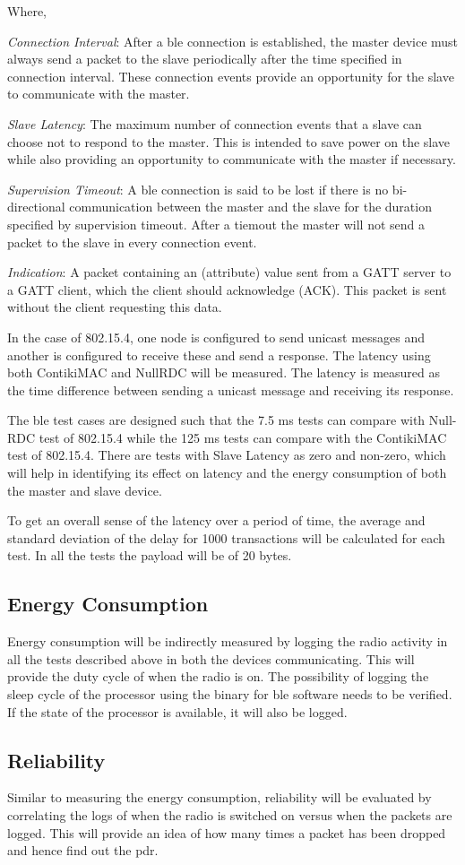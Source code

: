 Where,

\emph{Connection Interval}: After a \gls{ble} connection is established, the master device must always send a packet to the slave periodically after the time specified in connection interval. These connection events provide an opportunity for the slave to communicate with the master.

\emph{Slave Latency}: The maximum number of connection events that a slave can choose not to respond to the master. This is intended to save power on the slave while also providing an opportunity to communicate with the master if necessary.

\emph{Supervision Timeout}: A \gls{ble} connection is said to be lost if there is no bi-directional communication between the master and the slave for the duration specified by supervision timeout. After a tiemout the master will not send a packet to the slave in every connection event.

\emph{Indication}: A packet containing an (attribute) value sent from a GATT server to a GATT client, which the client should acknowledge (ACK). This packet is sent without the client requesting this data.

In the case of 802.15.4, one node is configured to send unicast messages and another is configured to receive these and send a response. The latency using both ContikiMAC and NullRDC will be measured. The latency is measured as the time difference between sending a unicast message and receiving its response.

The \gls{ble} test cases are designed such that the 7.5 \si{\milli\second} tests can compare with Null-RDC test of 802.15.4 while the 125 \si{\milli\second} tests can compare with the  ContikiMAC test of 802.15.4. There are tests with Slave Latency as zero and non-zero, which will help in identifying its effect on latency and the energy consumption of both the master and slave device.

To get an overall sense of the latency over a period of time, the average and standard deviation of the delay for 1000 transactions will be calculated for each test. In all the tests the payload will be of 20 bytes.

\subsection{Energy Consumption}
Energy consumption will be indirectly measured by logging the radio activity in all the tests described above in both the devices communicating. This will provide the duty cycle of when the radio is on. The possibility of logging the sleep cycle of the processor using the binary for \gls{ble} software needs to be verified. If the state of the processor is available, it will also be logged.

\subsection{Reliability}
Similar to measuring the energy consumption, reliability will be evaluated by  correlating the logs of when the radio is switched on versus when the packets are logged. This will provide an idea of how many times a packet has been dropped and hence find out the \gls{pdr}.
